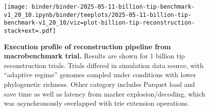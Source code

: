 \begin{figure}[h]
\centering
\texttt{[image: binder/binder-2025-05-11-billion-tip-benchmark-v1\_20\_10.ipynb/binder/teeplots/2025-05-11-billion-tip-benchmark-v1\_20\_10/viz=plot-billion-tip-reconstruction-stack+ext=.pdf]}
\vspace{-1em}
\caption{%
\textbf{Execution profile of reconstruction pipeline from macrobenchmark trial.}
\small
Results are shown for 1 billion tip reconstruction trials.
Trials differed in simulation data source, with ``adaptive regime'' genomes sampled under conditions with lower phylogenetic richness.
Other category includes Parquet load and save time as well as latency from marker explosion/decoding, which was asynchronously overlapped with trie extension operations.
}
\label{fig:billion-tip-time}
\vspace{-1.5em}
\end{figure}
